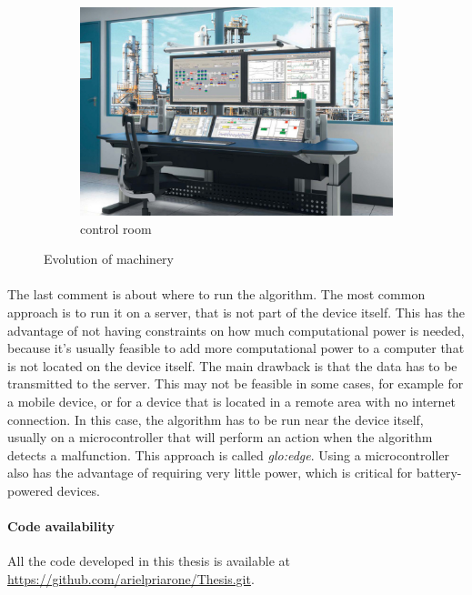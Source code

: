 \begin{figure}
\begin{subfigure}{0.3\textwidth}
        \includegraphics[width=\textwidth]{images/Intro/control-rooms-workstations.jpg}
        \caption{control room \cite{evosite}}
        \label{fig:controlroom}
    \end{subfigure}
    \caption{Evolution of machinery}
    \label{fig:machineryevolution}
\end{figure}

\paragraph*{}
The last comment is about where to run the algorithm. The most common approach is to run it on a server, that is not part of the device itself. This has the advantage of not having constraints on how much computational power is needed, because it's usually feasible to add more computational power to a computer that is not located on the device itself. The main drawback is that the data has to be transmitted to the server. This may not be feasible in some cases, for example for a mobile device, or for a device that is located in a remote area with no internet connection. In this case, the algorithm has to be run near the device itself, usually on a microcontroller that will perform an action when the algorithm detects a malfunction. This approach is called \emph{\gls{glo:edge}}. Using a microcontroller also has the advantage of requiring very little power, which is critical for battery-powered devices.

\ifprint
\else
\paragraph*{Code availability}
All the code developed in this thesis is available at \url{https://github.com/arielpriarone/Thesis.git}.
\fi
